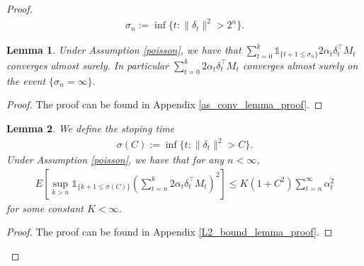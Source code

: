 \documentclass[11pt]{article}
\newtheorem{lemma}{Lemma}
\begin{document}
\begin{proof}
 \begin{align}\label{stop_time}
 \sigma_n :=\inf\{t: \|\delta_t\|^2 > 2^n\}.
 \end{align}
 

\begin{lemma}\label{as_conv_lemma}
Under Assumption \ref{poisson}, we have that $\sum_{t=0}^k \mathds{1}_{\{t+1\leq \sigma_n\}}2\alpha_t  \delta^\intercal_t M_t$ converges almost surely. In particular 
$\sum_{t=0}^k2\alpha_t \delta^\intercal_t M_t$ converges almost surely on the event $\{\sigma_n=\infty\}$. 
\end{lemma}
\begin{proof}
The proof can be found in Appendix \ref{as_conv_lemma_proof}.
\end{proof}
\begin{lemma}\label{L2_bound_lemma}
We define the stoping time
 \begin{align*}
 \sigma(C) :=\inf\{t: \|\delta_t\|^2 > C\}.
 \end{align*}
Under Assumption \ref{poisson}, we have that for any $n<\infty$, 
\begin{align*}
E\left[\sup_{k>n} \mathds{1}_{\{k+1 \leq \sigma(C)\}}\left(\sum_{t=n}^{k} 2\alpha_t \delta_t^\intercal M_t\right)^2  \right] \leq K (1+C^2) \sum_{t=n}^{\infty} \alpha_t^2
\end{align*}
for some constant $K<\infty$.
\end{lemma}
\begin{proof}
The proof can be found in Appendix \ref{L2_bound_lemma_proof}.
\end{proof}


\end{proof}
\end{document}
